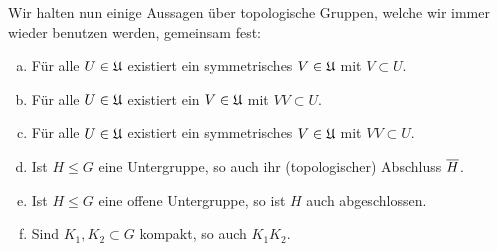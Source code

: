 Wir halten nun einige Aussagen über topologische Gruppen, welche wir immer
wieder benutzen werden, gemeinsam fest:
\begin{thLemma}\label{tg:basics}
    \hfill
    \begin{enumerate}[a)]
        \item \label{tg:basics:symV}
            Für alle $U\in\mathfrak{U}$ existiert ein symmetrisches $V\in\mathfrak{U}$ mit
            $V\subset U$.
        \item \label{tg:basics:VV}
            Für alle $U\in\mathfrak{U}$ existiert ein $V\in\mathfrak{U}$ mit $VV\subset U$.
        \item \label{tg:basics:symVV}
            Für alle $U\in\mathfrak{U}$ existiert ein symmetrisches $V\in\mathfrak{U}$ mit
            $VV\subset U$.
        \item \label{tg:basics:closureH}
            Ist $H\leq G$ eine Untergruppe, so auch ihr (topologischer) Abschluss
            $\overline{H}$.
        \item \label{tg:basics:openHclosed}
            Ist $H\leq G$ eine offene Untergruppe, so ist $H$ auch
            abgeschlossen.
        \item \label{tg:basics:KKcompact}
            Sind $K_1,K_2\subset G$ kompakt, so auch $K_1K_2$.
    \end{enumerate}
\end{thLemma}


